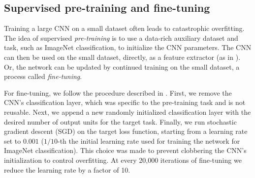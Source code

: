 \subsection{Supervised pre-training and fine-tuning}
\label{sub:fine-train}
Training a large CNN on a small dataset often leads to catastrophic overfitting.
The idea of supervised \emph{pre-training} is to use a data-rich auxiliary dataset and task, such as ImageNet classification, to initialize the CNN parameters. 
The CNN can then be used on the small dataset, directly, as a feature extractor (as in \cite{Decaf}).
Or, the network can be updated by continued training on the small dataset, a process called \emph{fine-tuning}.


For fine-tuning, we follow the procedure described in \cite{Rcnn}.
First, we remove the CNN's classification layer, which was specific to the pre-training task and is not reusable.
Next, we append a new randomly initialized classification layer with the desired number of output units for the target task.
Finally, we run stochastic gradient descent (SGD) on the target loss function, starting from a learning rate set to $0.001$ ($1/10$-th the initial learning rate used for training the network for ImageNet classification). 
This choice was made to prevent clobbering the CNN's initialization to control overfitting. 
At every 20,000 iterations of fine-tuning we reduce the learning rate by a factor of 10.

